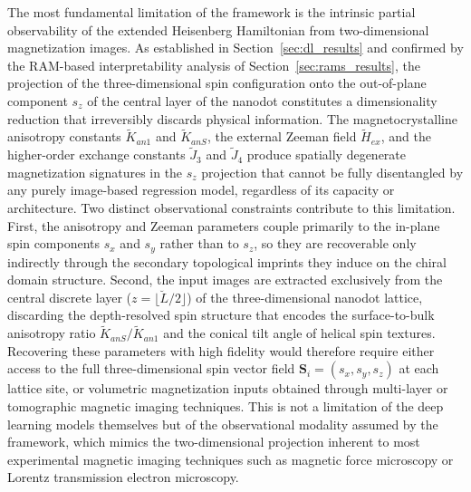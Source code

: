 \documentclass[a4paper,fleqn]{cas-sc}
\begin{document}
The most fundamental limitation of the framework is the intrinsic
partial observability of the extended Heisenberg Hamiltonian from
two-dimensional magnetization images. As established in
Section~\ref{sec:dl_results} and confirmed by the
RAM-based interpretability analysis of
Section~\ref{sec:rams_results}, the projection of the
three-dimensional spin configuration onto the out-of-plane component
$s_z$ of the central layer of the nanodot constitutes a
dimensionality reduction that irreversibly discards physical
information. The magnetocrystalline anisotropy constants
$\tilde{K}_{an1}$ and $\tilde{K}_{anS}$, the external Zeeman field
$\tilde{H}_{ex}$, and the higher-order exchange constants
$\tilde{J}_3$ and $\tilde{J}_4$ produce spatially degenerate
magnetization signatures in the $s_z$ projection that cannot be
fully disentangled by any purely image-based regression model,
regardless of its capacity or architecture. Two distinct
observational constraints contribute to this limitation. First, the
anisotropy and Zeeman parameters couple primarily to the in-plane
spin components $s_x$ and $s_y$ rather than to $s_z$, so they are
recoverable only indirectly through the secondary topological
imprints they induce on the chiral domain structure. Second, the
input images are extracted exclusively from the central discrete
layer ($z = \lfloor \breve{L}/2 \rfloor$) of the three-dimensional
nanodot lattice, discarding the depth-resolved spin structure that
encodes the surface-to-bulk anisotropy ratio
$\tilde{K}_{anS}/\tilde{K}_{an1}$ and the conical tilt angle of
helical spin textures. Recovering these parameters with high
fidelity would therefore require either access to the full
three-dimensional spin vector field $\mathbf{S}_i = (s_x, s_y, s_z)$
at each lattice site, or volumetric magnetization inputs obtained
through multi-layer or tomographic magnetic imaging techniques. This
is not a limitation of the deep learning models themselves but of
the observational modality assumed by the framework, which mimics
the two-dimensional projection inherent to most experimental
magnetic imaging techniques such as magnetic force microscopy or
Lorentz transmission electron microscopy.
\end{document}
